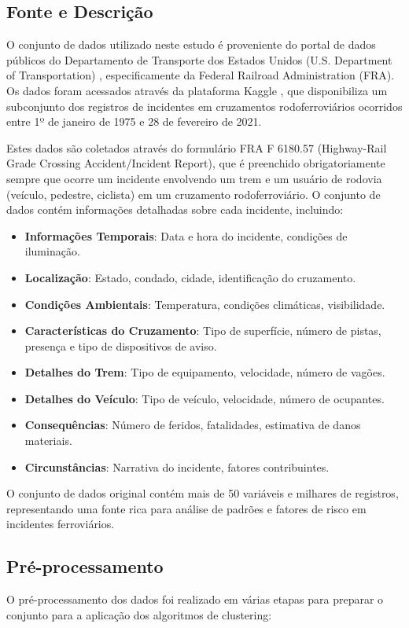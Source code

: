 \documentclass[conference]{IEEEtran}
\begin{document}
\subsection{Fonte e Descrição}
O conjunto de dados utilizado neste estudo é proveniente do portal de dados públicos do Departamento de Transporte dos Estados Unidos (U.S. Department of Transportation) \cite{fra2021data}, especificamente da Federal Railroad Administration (FRA). Os dados foram acessados através da plataforma Kaggle \cite{kaggle2021highway}, que disponibiliza um subconjunto dos registros de incidentes em cruzamentos rodoferroviários ocorridos entre 1º de janeiro de 1975 e 28 de fevereiro de 2021.

Estes dados são coletados através do formulário FRA F 6180.57 (Highway-Rail Grade Crossing Accident/Incident Report), que é preenchido obrigatoriamente sempre que ocorre um incidente envolvendo um trem e um usuário de rodovia (veículo, pedestre, ciclista) em um cruzamento rodoferroviário. O conjunto de dados contém informações detalhadas sobre cada incidente, incluindo:

\begin{itemize}
    \item \textbf{Informações Temporais}: Data e hora do incidente, condições de iluminação.
    \item \textbf{Localização}: Estado, condado, cidade, identificação do cruzamento.
    \item \textbf{Condições Ambientais}: Temperatura, condições climáticas, visibilidade.
    \item \textbf{Características do Cruzamento}: Tipo de superfície, número de pistas, presença e tipo de dispositivos de aviso.
    \item \textbf{Detalhes do Trem}: Tipo de equipamento, velocidade, número de vagões.
    \item \textbf{Detalhes do Veículo}: Tipo de veículo, velocidade, número de ocupantes.
    \item \textbf{Consequências}: Número de feridos, fatalidades, estimativa de danos materiais.
    \item \textbf{Circunstâncias}: Narrativa do incidente, fatores contribuintes.
\end{itemize}

O conjunto de dados original contém mais de 50 variáveis e milhares de registros, representando uma fonte rica para análise de padrões e fatores de risco em incidentes ferroviários.

\subsection{Pré-processamento}
O pré-processamento dos dados foi realizado em várias etapas para preparar o conjunto para a aplicação dos algoritmos de clustering:
\end{document}

